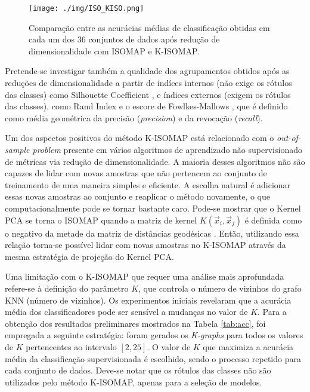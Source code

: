 \documentclass[a4paper,12pt]{article}
\begin{document}
\begin{figure}[ht]
\begin{center}
\centerline{\texttt{[image: ./img/ISO\_KISO.png]}}
\caption{Comparação entre as acurácias médias de classificação obtidas em cada um dos 36 conjuntos de dados após redução de dimensionalidade com ISOMAP e K-ISOMAP.}
\label{fig:graph}
\end{center}
\end{figure}

Pretende-se investigar também a qualidade dos agrupamentos obtidos após as reduções de dimensionalidade a partir de indíces internos (não exige os rótulos das classes) como Silhouette Coefficient \cite{Silhouette}, e índices externos (exigem os rótulos das classes), como Rand Index \cite{Rand} e o escore de Fowlkes-Mallows \cite{Fowlkes}, que é definido como média geométrica da precisão (\emph{precision}) e da revocação (\emph{recall}).

Um dos aspectos positivos do método K-ISOMAP está relacionado com o \emph{out-of-sample problem} presente em vários algoritmos de aprendizado não supervisionado de métricas via redução de dimensionalidade. A maioria desses algoritmos não são capazes de lidar com novas amostras que não pertencem ao conjunto de treinamento de uma maneira simples e eficiente. A escolha natural é adicionar essas novas amostras ao conjunto e reaplicar o método novamente, o que computacionalmente pode se tornar bastante caro. Pode-se mostrar que o Kernel PCA se torna o ISOMAP quando a matriz de kernel $K(\vec{x}_i, \vec{x}_j)$ é definida como o negativo da metade da matriz de distâncias geodésicas \cite{KPCA}. Então, utilizando essa relação torna-se possível lidar com novas amostras no K-ISOMAP através da mesma estratégia de projeção do Kernel PCA. 

Uma limitação com o K-ISOMAP que requer uma análise mais aprofundada refere-se à definição do parâmetro $K$, que controla o número de vizinhos do grafo KNN (número de vizinhos). Os experimentos iniciais revelaram que a acurácia média dos classificadores pode ser sensível a mudanças no valor de $K$. Para a obtenção dos resultados preliminares mostrados na Tabela \ref{tab:acc}, foi empregada a seguinte estratégia: foram gerados os \emph{K-graphs} para todos os valores de $K$ pertencentes ao intervalo $[2, 25]$. O valor de $K$ que maximiza a acurácia média da classificação supervisionada é escolhido, sendo o processo repetido para cada conjunto de dados. Deve-se notar que os rótulos das classes não são utilizados pelo método K-ISOMAP, apenas para a seleção de modelos.
\end{document}
